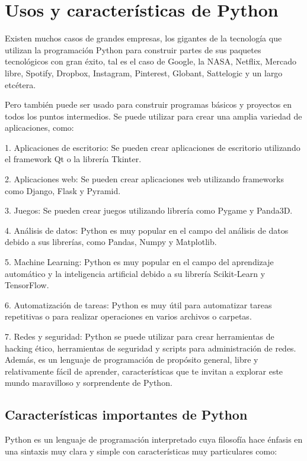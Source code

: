 \section{Usos y características de Python}

Existen muchos casos de grandes empresas, los gigantes de la tecnología que utilizan la programación Python para construir partes de sus paquetes tecnológicos con gran éxito, tal es el caso de Google, la NASA, Netflix, Mercado libre, Spotify, Dropbox, Instagram, Pinterest, Globant, Sattelogic y un largo etcétera.


Pero también puede ser usado para construir programas básicos y proyectos en todos los puntos intermedios. Se puede utilizar para crear una amplia variedad de aplicaciones, como:

1. Aplicaciones de escritorio: Se pueden crear aplicaciones de escritorio utilizando el framework Qt o la librería  Tkinter.

2. Aplicaciones web: Se pueden crear aplicaciones web utilizando frameworks como Django, Flask y Pyramid.

3. Juegos: Se pueden crear juegos utilizando librería como Pygame y Panda3D.

4. Análisis de datos: Python es muy popular en el campo del análisis de datos debido a sus librerías, como Pandas, Numpy y Matplotlib.

5. Machine Learning: Python es muy popular en el campo del aprendizaje automático y la inteligencia artificial debido a su librería Scikit-Learn y TensorFlow.

6. Automatización de tareas: Python es muy útil para automatizar tareas repetitivas o para realizar operaciones en varios archivos o carpetas.

7. Redes y seguridad: Python se puede utilizar para crear herramientas de hacking ético, herramientas de seguridad y scripts para administración de redes.\\


 Además, es un lenguaje  de programación de propósito general, libre y relativamente fácil de aprender,  características que te invitan a explorar este mundo maravilloso y sorprendente  de Python. 
 
\subsection{Características importantes de Python}

Python es un lenguaje de programación interpretado cuya filosofía hace énfasis  en una sintaxis muy clara y simple con características muy particulares como: \\

